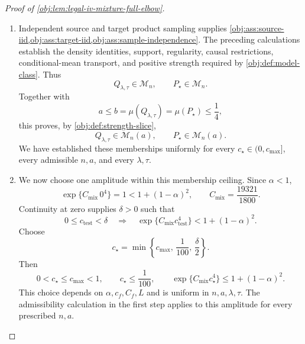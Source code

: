 \documentclass[11pt]{article}
\begin{document}
\begin{proof}[Proof of \cref{obj:lem:legal-iv-mixture-full-elbow}]
\begin{enumerate}
Define the separation functional by
\[
J_n
=
h^2\int_0^1
\frac{B(t)^2}{1/4-h^2B(t)^2}\,dt.
\]
The reflection identity \(B(1-t)=-B(t)\) from \cref{obj:synth_16} implies
\[
\int_0^1
\frac{B(t)^3}{1/4-h^2B(t)^2}\,dt
=
-\int_0^1
\frac{B(t)^3}{1/4-h^2B(t)^2}\,dt
=0.
\]
Changing variables separately on each cell therefore gives
\[
\int_0^1\frac{u(x)^2}{1/4-u(x)^2}\,dx=J_n,
\qquad
\int_0^1\frac{u(x)^3}{1/4-u(x)^2}\,dx=0.
\]
Since \(v=\tau u\), the target complier-weighted outcome effect equals
\[
\begin{aligned}
\mathbb E_{Q_{\lambda,\tau}}[(Y(1)-Y(0))C\mid S=0]
&=-\tau\int_0^1
\left\{
\frac{u(x)^2}{1/4-u(x)^2}
+\frac{u(x)^3}{1/4-u(x)^2}
\right\}\,dx\\
&=-\tau J_n.
\end{aligned}
\]
Dividing by the positive target complier share gives
\[
\theta(Q_{\lambda,\tau})=-\frac{\tau J_n}{b}.
\]
In particular,
\[
J_n=-b\,\theta(Q_{\lambda,1}).
\]
For the center, the same calculations with zero perturbations give
\[
\mu(P_{\star})=b,\qquad \theta(P_{\star})=0.
\]

\item
Independent source and target product sampling supplies
\cref{obj:ass:source-iid,obj:ass:target-iid,obj:ass:sample-independence}.
The preceding calculations establish the density identities, support, regularity, causal restrictions, conditional-mean transport, and positive strength required by
\cref{obj:def:model-class}. Thus
\[
Q_{\lambda,\tau}\in\mathcal M_n,\qquad
P_{\star}\in\mathcal M_n.
\]
Together with
\[
a\le b=\mu(Q_{\lambda,\tau})=\mu(P_{\star})\le\frac14,
\]
this proves, by \cref{obj:def:strength-slice},
\[
Q_{\lambda,\tau}\in\mathcal M_n(a),
\qquad
P_{\star}\in\mathcal M_n(a).
\]
We have established these memberships uniformly for every
\(c_{\star}\in(0,c_{\max}]\), every admissible \(n,a\), and every \(\lambda,\tau\).

\item
We now choose one amplitude within this membership ceiling. Since \(\alpha<1\),
\[
\exp\{C_{\mathrm{mix}}\,0^4\}=1<1+(1-\alpha)^2,
\qquad
C_{\mathrm{mix}}=\frac{19321}{1800}.
\]
Continuity at zero supplies \(\delta>0\) such that
\[
0\le c_{\mathrm{test}}<\delta
\quad\Longrightarrow\quad
\exp\{C_{\mathrm{mix}}c_{\mathrm{test}}^4\}
<1+(1-\alpha)^2.
\]
Choose
\[
c_{\star}
=
\min\left\{c_{\max},\,\frac1{100},\,\frac{\delta}{2}\right\}.
\]
Then
\[
0<c_{\star}\le c_{\max}<1,\qquad
c_{\star}\le\frac1{100},\qquad
\exp\{C_{\mathrm{mix}}c_{\star}^4\}\le1+(1-\alpha)^2.
\]
This choice depends on \(\alpha,c_f,C_f,L\) and is uniform in \(n,a,\lambda,\tau\). The admissibility calculation in the first step applies to this amplitude for every prescribed \(n,a\).


\end{enumerate}
\end{proof}
\end{document}
